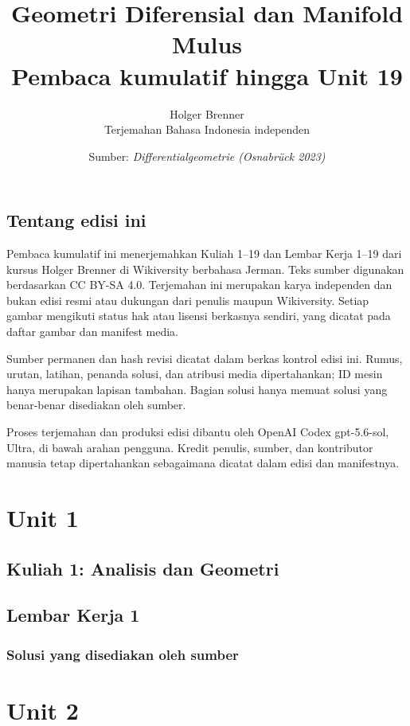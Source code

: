 \documentclass[11pt,a4paper,oneside]{book}
\title{Geometri Diferensial dan Manifold Mulus\\\large Pembaca kumulatif hingga Unit 19}
\author{Holger Brenner\\Terjemahan Bahasa Indonesia independen}
\date{Sumber: \textit{Differentialgeometrie (Osnabrück 2023)}}
\begin{document}
\hypersetup{pageanchor=false}
\maketitle
\hypersetup{pageanchor=true}
\frontmatter
\chapter*{Tentang edisi ini}
Pembaca kumulatif ini menerjemahkan Kuliah 1--19 dan Lembar Kerja 1--19 dari kursus Holger Brenner di Wikiversity berbahasa Jerman. Teks sumber digunakan berdasarkan CC BY-SA 4.0. Terjemahan ini merupakan karya independen dan bukan edisi resmi atau dukungan dari penulis maupun Wikiversity. Setiap gambar mengikuti status hak atau lisensi berkasnya sendiri, yang dicatat pada daftar gambar dan manifest media.

Sumber permanen dan hash revisi dicatat dalam berkas kontrol edisi ini. Rumus, urutan, latihan, penanda solusi, dan atribusi media dipertahankan; ID mesin hanya merupakan lapisan tambahan. Bagian solusi hanya memuat solusi yang benar-benar disediakan oleh sumber.

Proses terjemahan dan produksi edisi dibantu oleh OpenAI Codex gpt-5.6-sol, Ultra, di bawah arahan pengguna. Kredit penulis, sumber, dan kontributor manusia tetap dipertahankan sebagaimana dicatat dalam edisi dan manifestnya.
\tableofcontents

\mainmatter
\part{Unit 1}
\chapter[Kuliah 1]{Kuliah 1: Analisis dan Geometri}


\chapter{Lembar Kerja 1}


\section*{Solusi yang disediakan oleh sumber}


\part{Unit 2}
\end{document}
